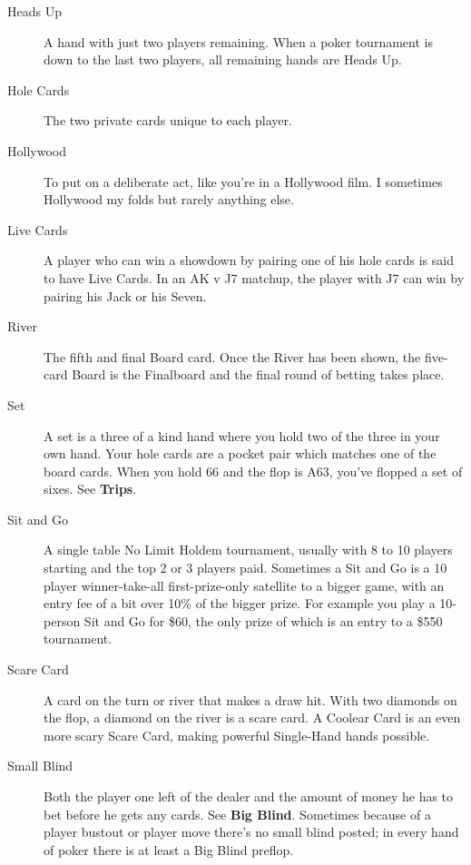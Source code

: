 \begin{description}
\item[Heads Up] A hand with just two players remaining. When a poker
tournament is down to the last two players, all remaining hands are
Heads Up.

\item[Hole Cards] The two private cards unique to each player.

\item[Hollywood] To put on a deliberate act, like you're in a
Hollywood film. I sometimes Hollywood my folds but rarely anything
else.

\item[Live Cards] A player who can win a showdown by pairing one of
his hole cards is said to have Live Cards. In an AK v J7 matchup, the
player with J7 can win by pairing his Jack or his Seven.

\item[River] The fifth and final Board card. Once the River has been
shown, the five-card Board is the Finalboard and the final round of
betting takes place.

\item[Set] A set is a three of a kind hand where you hold two of the
three in your own hand. Your hole cards are a pocket pair which
matches one of the board cards. When you hold 66 and the flop is A63,
you've flopped a set of sixes. See \textbf{Trips}.

\item[Sit and Go] A single table No Limit Holdem tournament, usually
with 8 to 10 players starting and the top 2 or 3 players
paid. Sometimes a Sit and Go is a 10 player winner-take-all
first-prize-only satellite to a bigger game, with an entry fee of a
bit over 10\% of the bigger prize. For example you play a 10-person
Sit and Go for \$60, the only prize of which is an entry to a \$550
tournament.

\item[Scare Card] A card on the turn or river that makes a draw hit.
With two diamonds on the flop, a diamond on the river is a scare card.
A Coolear Card is an even more scary Scare Card, making powerful
Single-Hand hands possible.

\item[Small Blind] Both the player one left of the dealer and the
amount of money he has to bet before he gets any cards. See
\textbf{Big Blind}. Sometimes because of a player bustout or player
move there's no small blind posted; in every hand of poker there is at
least a Big Blind preflop.


\end{description}
